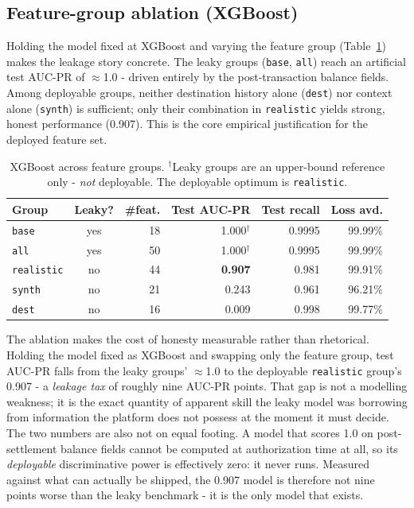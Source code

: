 \documentclass[11pt,a4paper]{report}
\newcommand{\code}[1]{\texttt{\small #1}}
\begin{document}
\subsection{Feature-group ablation (XGBoost)}

Holding the model fixed at XGBoost and varying the feature group
(Table~\ref{tab:ablation}) makes the leakage story concrete. The leaky groups
(\code{base}, \code{all}) reach an artificial test AUC-PR of $\approx$1.0 - driven entirely
by the post-transaction balance fields. Among deployable groups, neither destination history
alone (\code{dest}) nor context alone (\code{synth}) is sufficient; only their combination
in \code{realistic} yields strong, honest performance (0.907). This is the core empirical
justification for the deployed feature set.

\begin{table}[h]
\centering
\small
\begin{tabular}{@{}l c rrrr@{}}
\toprule
\textbf{Group} & \textbf{Leaky?} & \textbf{\#feat.} & \textbf{Test AUC-PR} & \textbf{Test recall} & \textbf{Loss avd.}\\
\midrule
\code{base} & yes & 18 & 1.000$^{\dagger}$ & 0.9995 & 99.99\%\\
\code{all}  & yes & 50 & 1.000$^{\dagger}$ & 0.9995 & 99.99\%\\
\code{realistic} & no & 44 & \textbf{0.907} & 0.981 & 99.91\%\\
\code{synth} & no & 21 & 0.243 & 0.961 & 96.21\%\\
\code{dest}  & no & 16 & 0.009 & 0.998 & 99.77\%\\
\bottomrule
\end{tabular}
\caption{XGBoost across feature groups. $^{\dagger}$Leaky groups are an upper-bound
reference only - \emph{not} deployable. The deployable optimum is \code{realistic}.}
\label{tab:ablation}
\end{table}

The ablation makes the cost of honesty measurable rather than rhetorical. Holding the model fixed as XGBoost and swapping only the feature group, test AUC-PR falls from the leaky groups' $\approx$1.0 to the deployable \code{realistic} group's 0.907 - a \emph{leakage tax} of roughly nine AUC-PR points. That gap is not a modelling weakness; it is the exact quantity of apparent skill the leaky model was borrowing from information the platform does not possess at the moment it must decide. The two numbers are also not on equal footing. A model that scores 1.0 on post-settlement balance fields cannot be computed at authorization time at all, so its \emph{deployable} discriminative power is effectively zero: it never runs. Measured against what can actually be shipped, the 0.907 model is therefore not nine points worse than the leaky benchmark - it is the only model that exists.
\end{document}
